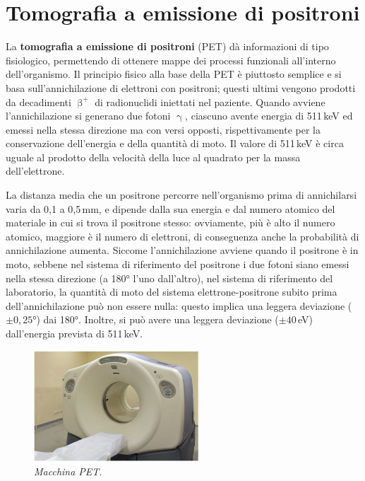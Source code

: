 \documentclass{report}
\numberwithin{equation}{section}
\numberwithin{figure}{section}
\begin{document}
\section{Tomografia a emissione di positroni}
La \textbf{tomografia a emissione di positroni} (PET) dà informazioni di tipo fisiologico, permettendo di ottenere mappe dei processi funzionali all'interno dell'organismo. Il principio fisico alla base della PET è piuttosto semplice e si basa sull'annichilazione di elettroni con positroni; questi ultimi vengono prodotti da decadimenti $\upbeta^+$ di radionuclidi iniettati nel paziente. Quando avviene l'annichilazione si generano due fotoni $\upgamma$, ciascuno avente energia di 511\,keV ed emessi nella stessa direzione ma con versi opposti, rispettivamente per la conservazione dell'energia e della quantità di moto. Il valore di 511\,keV è circa uguale al prodotto della velocità della luce al quadrato per la massa dell'elettrone.

La distanza media che un positrone percorre nell'organismo prima di annichilarsi varia da 0,1 a 0,5\,mm, e dipende dalla sua energia e dal numero atomico del materiale in cui si trova il positrone stesso: ovviamente, più è alto il numero atomico, maggiore è il numero di elettroni, di conseguenza anche la probabilità di annichilazione aumenta. Siccome l'annichilazione avviene quando il positrone è in moto, sebbene nel sistema di riferimento del positrone i due fotoni siano emessi nella stessa direzione (a 180° l'uno dall'altro), nel sistema di riferimento del laboratorio, la quantità di moto del sistema elettrone-positrone subito prima dell'annichilazione può non essere nulla: questo implica una leggera deviazione ($\pm 0,25$°) dai 180°. Inoltre, si può avere una leggera deviazione ($\pm 40$\,eV) dall'energia prevista di 511\,keV.

\begin{figure}
    \centering
    \includegraphics[width=0.55\textwidth]{immagini/petm.png}
    \caption{\textit{Macchina PET}.}
    \label{fig:petm}
\end{figure}
\end{document}
